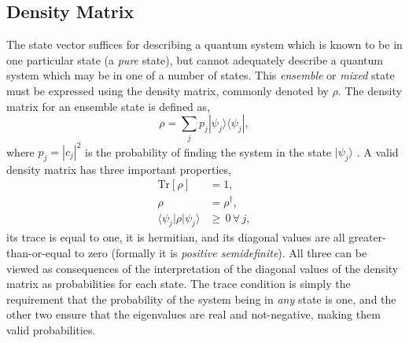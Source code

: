 \subsection{Density Matrix}
The state vector suffices for describing a quantum system which is known to be in one particular state (a \emph{pure} state), but cannot adequately describe a quantum system which may be in one of a number of states. This \emph{ensemble} or \emph{mixed} state must be expressed using the density matrix, commonly denoted by \(\rho\). The density matrix for an ensemble state is defined as,
\begin{equation}
	\rho = \sum_{j} p_{j} |\psi_{j} \rangle \langle \psi_{j}|,
	\label{eq:oqs2-1}
\end{equation}
where \(p_{j} = |c_{j}|^{2}\) is the probability of finding the system in the state \(|\psi_{j}\rangle\) \cite{NielsenChuang_DM}. A valid density matrix has three important properties,
\begin{align}
	\mathrm{Tr}[\rho] &= 1, \label{eq:oqs2-2} \\
	\rho &= \rho^{\dagger}, \label{eq:oqs2-3} \\
	\langle \psi_{j}| \rho | \psi_{j} \rangle &\geq \, 0 \, \forall \, j, \label{eq:oqs2-4}
\end{align}
its trace is equal to one, it is hermitian, and its diagonal values are all greater-than-or-equal to zero (formally it is \emph{positive semidefinite}). All three can be viewed as consequences of the interpretation of the diagonal values of the density matrix as probabilities for each state. The trace condition is simply the requirement that the probability of the system being in \emph{any} state is one, and the other two ensure that the eigenvalues are real and not-negative, making them valid probabilities.

